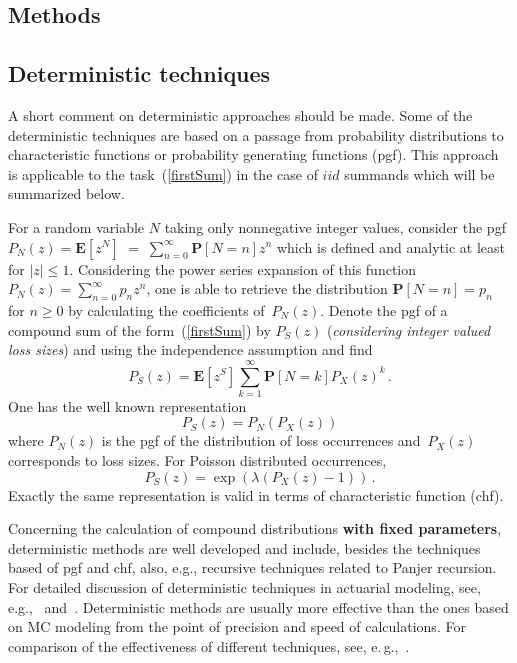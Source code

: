 \begin{multicols}{2}
\section{Methods}

\subsection{Deterministic techniques}

\noindent
A short comment on deterministic approaches should be made. Some of the
deterministic techniques are based on a passage from probability
distributions to characteristic functions or probability generating
functions (pgf). This approach is applicable to the task~(\ref{firstSum})
in the case of $iid$ summands which will be summarized below.

For a random variable $N$ taking only nonnegative integer values,
consider the pgf $P_N(z) =
\mathbf{E}[z^N]$\linebreak
$=\;\sum\limits_{n=0}^\infty \mathbf{P}[N=n] z^n$ which is
defined and analytic at least for $|z|\le1$. Considering the power
series expansion of this function $P_N(z) = \sum\limits_{n=0}^\infty p_n
z^n$, one is able to retrieve the distribution $\mathbf{P}[N = n] =
p_n$ for $n \ge 0$ by calculating the coefficients of~$P_N(z)$.
Denote the pgf of a compound sum of the form~(\ref{firstSum}) by
$P_S(z)$ ({\it considering integer valued loss sizes}) and using
the independence assumption and find
\begin{equation*}
P_S(z)=\mathbf{E}[z^S]\sum_{k=1}^{\infty} \mathbf{P}[N=k]
P_X(z)^k\,.
\end{equation*}
One has the well known representation
\begin{equation}
\label{eq:pgfCompoundSum}
    P_S(z) = P_N(P_X(z))
\end{equation}
where $P_N(z)$ is the pgf of the distribution of loss occurrences
and~$P_X(z)$ corresponds to loss sizes.  For Poisson distributed occurrences,
\begin{equation*}
        P_S(z) = \exp(\lambda(P_X(z)-1))\,.
\end{equation*}
Exactly the same
representation is valid in terms of characteristic function (chf).

Concerning the calculation of compound distributions {\bf with
fixed parameters}, deterministic methods are well developed and
include, besides the techniques based of pgf and chf, also, e.g.,
recursive techniques related to Panjer recursion. For detailed
discussion of deterministic techniques in actuarial modeling, see,
e.g.,~\cite{KPW} and~\cite{Panjer}. Deterministic methods are
usually more effective than the ones based on MC
modeling from the point of precision and speed of calculations.
For comparison of the effectiveness of different techniques, see,
e.\,g.,~\cite{TW}.


\end{multicols}
